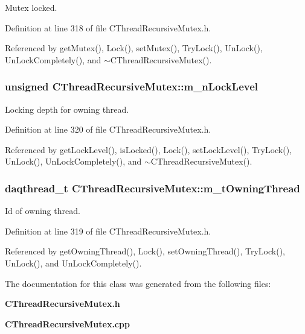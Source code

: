 Mutex locked.



Definition at line 318 of file CThread\-Recursive\-Mutex.h.

Referenced by get\-Mutex(), Lock(), set\-Mutex(), Try\-Lock(), Un\-Lock(), Un\-Lock\-Completely(), and $\sim$CThread\-Recursive\-Mutex().
\subsubsection{\setlength{\rightskip}{0pt plus 5cm}unsigned CThread\-Recursive\-Mutex::m\_\-n\-Lock\-Level\hspace{0.3cm}{\tt  [private]}}\label{classCThreadRecursiveMutex_o2}


Locking depth for owning thread.



Definition at line 320 of file CThread\-Recursive\-Mutex.h.

Referenced by get\-Lock\-Level(), is\-Locked(), Lock(), set\-Lock\-Level(), Try\-Lock(), Un\-Lock(), Un\-Lock\-Completely(), and $\sim$CThread\-Recursive\-Mutex().
\subsubsection{\setlength{\rightskip}{0pt plus 5cm}daqthread\_\-t CThread\-Recursive\-Mutex::m\_\-t\-Owning\-Thread\hspace{0.3cm}{\tt  [private]}}\label{classCThreadRecursiveMutex_o1}


Id of owning thread.



Definition at line 319 of file CThread\-Recursive\-Mutex.h.

Referenced by get\-Owning\-Thread(), Lock(), set\-Owning\-Thread(), Try\-Lock(), Un\-Lock(), and Un\-Lock\-Completely().

The documentation for this class was generated from the following files:\begin{CompactItemize}
\item 
{\bf CThread\-Recursive\-Mutex.h}\item 
{\bf CThread\-Recursive\-Mutex.cpp}\end{CompactItemize}
